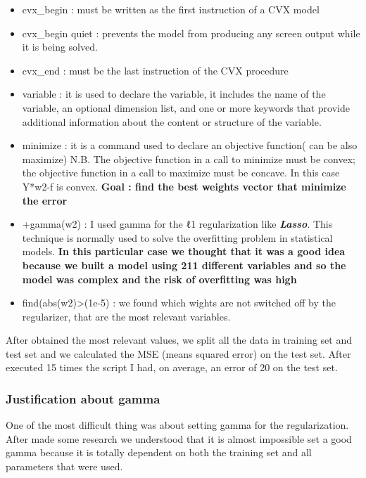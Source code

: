 \documentclass[sigconf]{acmart}
\begin{document}
\begin{itemize}
\item cvx\_begin : must be written as the first instruction of a CVX model
\item cvx\_begin quiet : prevents the model from producing any screen output while it is being solved.
\item cvx\_end : must be the last instruction of the CVX procedure 
\item variable : it is used to declare the variable, it includes the name
of the variable, an optional dimension list, and one or more keywords that provide additional information about the content or structure of the variable.
\item minimize : it is a command used to declare an objective function( can be also maximize) 
N.B. The objective function in a call to minimize must be convex; the objective function in a call to maximize must be concave. In this case Y*w2-f is convex.
\textbf{Goal : find the best weights vector that minimize the error }
\item +gamma(w2) : I used gamma for the ℓ1 regularization like \textit{\textbf{Lasso}}. This technique is normally used to solve the overfitting problem in statistical models. \textbf{In this particular case we thought that it was a good idea because we built a model using 211 different variables and so the model was complex and the risk of overfitting was high}
\item find(abs(w2)\textgreater(1e-5) : we found which wights are not switched off by the regularizer, that are the most relevant variables. 
\end{itemize}

After obtained the most relevant values, we split all the data in training set and test set and  we calculated the MSE (means squared error) on the test set. After executed 15 times the script I had, on average, an error of 20 on the test set. 


\subsubsection{Justification about gamma \\}

One of the most difficult thing was about setting gamma for the regularization. After made some research we understood that it is almost impossible set a good gamma because it is totally dependent on both the training set and all parameters that were used\cite{2}. 
\end{document}
